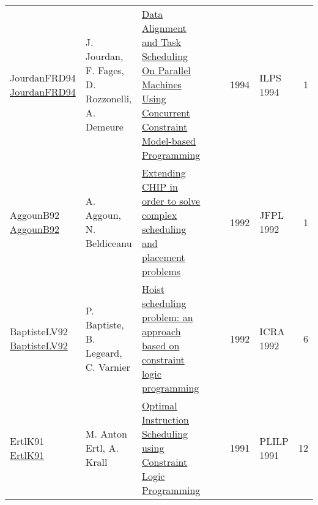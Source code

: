 {\begin{longtable}{p{3cm}p{6cm}p{7cm}rrrp{3cm}r}
JourdanFRD94 \href{}{JourdanFRD94} & J. Jourdan, F. Fages, D. Rozzonelli, A. Demeure & \href{}{Data Alignment and Task Scheduling On Parallel Machines Using Concurrent Constraint Model-based Programming} &  & \cite{JourdanFRD94} & 1994 & ILPS 1994 & 1\\
AggounB92 \href{}{AggounB92} & A. Aggoun, N. Beldiceanu & \href{}{Extending {CHIP} in order to solve complex scheduling and placement problems} &  & \cite{AggounB92} & 1992 & JFPL 1992 & 1\\
BaptisteLV92 \href{https://doi.org/10.1109/ROBOT.1992.220195}{BaptisteLV92} & P. Baptiste, B. Legeard, C. Varnier & \href{papers/BaptisteLV92.pdf}{Hoist scheduling problem: an approach based on constraint logic programming} &  & \cite{BaptisteLV92} & 1992 & ICRA 1992 & 6\\
ErtlK91 \href{https://doi.org/10.1007/3-540-54444-5\_89}{ErtlK91} & M. Anton Ertl, A. Krall & \href{papers/ErtlK91.pdf}{Optimal Instruction Scheduling using Constraint Logic Programming} &  & \cite{ErtlK91} & 1991 & PLILP 1991 & 12\\
\end{longtable}
}

